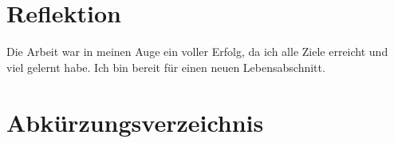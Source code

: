 \documentclass[
11pt, %
a4paper, %
BCOR25mm, %
DIV14, %
footsepline = false, %
headsepline, %
twoside, %
openright,
abstracton, %
listof=totocnumbered, %
bibliography=totocnumbered %
]{scrreprt}
\begin{document}
  \cleardoublepage
  
  
  \chapter{Reflektion}
  
  Die Arbeit war in meinen Auge ein voller Erfolg, da ich alle Ziele erreicht
  und viel gelernt habe. Ich bin bereit für einen neuen
  Lebensabschnitt.

  \cleardoublepage
  
  
  \appendix
  
%  
  
  
  \chapter{Abkürzungsverzeichnis}
  \begin{acronym}
    \setlength{\itemsep}{-\parsep}
  \end{acronym}
  
  
  \listoffigures
  
  
  \listoftables
  
  
  
  \cleardoublepage
  
\end{document}
